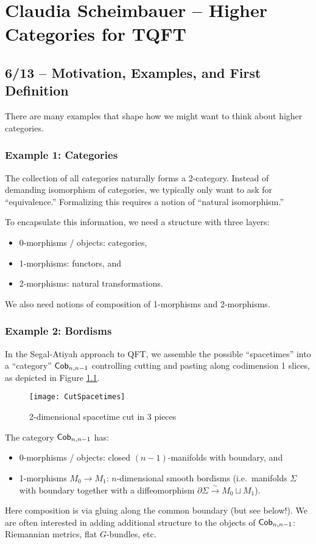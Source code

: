 \chapter{Claudia Scheimbauer -- Higher Categories for TQFT}

\section{6/13 -- Motivation, Examples, and First Definition}

There are many examples that shape how we might want to think about higher categories.

\subsection{Example 1: Categories}

The collection of all categories naturally forms a 2-category.
Instead of demanding isomorphism of categories, we typically only want to ask for ``equivalence.''
Formalizing this requires a notion of ``natural isomorphism.''

To encapsulate this information, we need a structure with three layers:
\begin{itemize}
	\item 0-morphisms / objects: categories,
	\item 1-morphisms: functors, and
	\item 2-morphisms: natural transformations.
\end{itemize}
We also need notions of composition of 1-morphisms and 2-morphisms.

\subsection{Example 2: Bordisms}

In the Segal-Atiyah approach to QFT, we assemble the possible ``spacetimes'' into a ``category'' $\mathsf{Cob}_{n,n-1}$ controlling cutting and pasting along codimension 1 slices, as depicted in Figure \ref{fig:CutSpacetimes}.
\begin{figure}[h]
\centering
\texttt{[image: CutSpacetimes]}
\caption{2-dimensional spacetime cut in 3 pieces}
\label{fig:CutSpacetimes}
\end{figure}
The category $\mathsf{Cob}_{n,n-1}$ has:
\begin{itemize}
	\item 0-morphisms / objects: closed $(n-1)$-manifolds with boundary, and
	\item 1-morphisms $M_0 \to M_1$: $n$-dimensional smooth bordisms (i.e.\ manifolds $\Sigma$ with boundary together with a diffeomorphism $\partial \Sigma \xrightarrow{\sim} M_0 \sqcup M_1$).
\end{itemize}
Here composition is via gluing along the common boundary (but see below!).
We are often interested in adding additional structure to the objects of $\mathsf{Cob}_{n,n-1}$: Riemannian metrics, flat $G$-bundles, etc.

